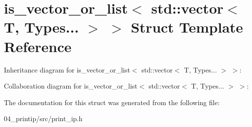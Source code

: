 \hypertarget{structis__vector__or__list_3_01std_1_1vector_3_01T_00_01Types_8_8_8_01_4_01_4}{}\section{is\+\_\+vector\+\_\+or\+\_\+list$<$ std\+:\+:vector$<$ T, Types... $>$ $>$ Struct Template Reference}
\label{structis__vector__or__list_3_01std_1_1vector_3_01T_00_01Types_8_8_8_01_4_01_4}


Inheritance diagram for is\+\_\+vector\+\_\+or\+\_\+list$<$ std\+:\+:vector$<$ T, Types... $>$ $>$\+:


Collaboration diagram for is\+\_\+vector\+\_\+or\+\_\+list$<$ std\+:\+:vector$<$ T, Types... $>$ $>$\+:


The documentation for this struct was generated from the following file\+:\begin{DoxyCompactItemize}
\item 
04\+\_\+printip/src/print\+\_\+ip.\+h\end{DoxyCompactItemize}
